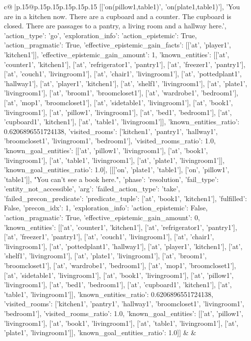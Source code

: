 \documentclass{article}
\begin{document}
{\begin{supertabular}{c@{$\;$}|p{.15\linewidth}@{}p{.15\linewidth}p{.15\linewidth}p{.15\linewidth}p{.15\linewidth}p{.15\linewidth}}
{{{[['on(pillow1,table1)', 'on(plate1,table1)'], 'You are in a kitchen now. There are a cupboard and a counter. The cupboard is closed. There are passages to a pantry, a living room and a hallway here.', {'action_type': 'go', 'exploration_info': {'action_epistemic': True, 'action_pragmatic': True, 'effective_epistemic_gain_facts': [['at', 'player1', 'kitchen1']], 'effective_epistemic_gain_amount': 1, 'known_entities': [['at', 'counter1', 'kitchen1'], ['at', 'refrigerator1', 'pantry1'], ['at', 'freezer1', 'pantry1'], ['at', 'couch1', 'livingroom1'], ['at', 'chair1', 'livingroom1'], ['at', 'pottedplant1', 'hallway1'], ['at', 'player1', 'kitchen1'], ['at', 'shelf1', 'livingroom1'], ['at', 'plate1', 'livingroom1'], ['at', 'broom1', 'broomcloset1'], ['at', 'wardrobe1', 'bedroom1'], ['at', 'mop1', 'broomcloset1'], ['at', 'sidetable1', 'livingroom1'], ['at', 'book1', 'livingroom1'], ['at', 'pillow1', 'livingroom1'], ['at', 'bed1', 'bedroom1'], ['at', 'cupboard1', 'kitchen1'], ['at', 'table1', 'livingroom1']], 'known_entities_ratio': 0.6206896551724138, 'visited_rooms': ['kitchen1', 'pantry1', 'hallway1', 'broomcloset1', 'livingroom1', 'bedroom1'], 'visited_rooms_ratio': 1.0, 'known_goal_entities': [['at', 'pillow1', 'livingroom1'], ['at', 'book1', 'livingroom1'], ['at', 'table1', 'livingroom1'], ['at', 'plate1', 'livingroom1']], 'known_goal_entities_ratio': 1.0}}], [[['on', 'plate1', 'table1'], ['on', 'pillow1', 'table1']], "You can't see a book here.", {'phase': 'resolution', 'fail_type': 'entity_not_accessible', 'arg': {'failed_action_type': 'take', 'failed_precon_predicate': {'predicate_tuple': ['at', 'book1', 'kitchen1'], 'fulfilled': False, 'precon_idx': 1}}, 'exploration_info': {'action_epistemic': False, 'action_pragmatic': True, 'effective_epistemic_gain_amount': 0, 'known_entities': [['at', 'counter1', 'kitchen1'], ['at', 'refrigerator1', 'pantry1'], ['at', 'freezer1', 'pantry1'], ['at', 'couch1', 'livingroom1'], ['at', 'chair1', 'livingroom1'], ['at', 'pottedplant1', 'hallway1'], ['at', 'player1', 'kitchen1'], ['at', 'shelf1', 'livingroom1'], ['at', 'plate1', 'livingroom1'], ['at', 'broom1', 'broomcloset1'], ['at', 'wardrobe1', 'bedroom1'], ['at', 'mop1', 'broomcloset1'], ['at', 'sidetable1', 'livingroom1'], ['at', 'book1', 'livingroom1'], ['at', 'pillow1', 'livingroom1'], ['at', 'bed1', 'bedroom1'], ['at', 'cupboard1', 'kitchen1'], ['at', 'table1', 'livingroom1']], 'known_entities_ratio': 0.6206896551724138, 'visited_rooms': ['kitchen1', 'pantry1', 'hallway1', 'broomcloset1', 'livingroom1', 'bedroom1'], 'visited_rooms_ratio': 1.0, 'known_goal_entities': [['at', 'pillow1', 'livingroom1'], ['at', 'book1', 'livingroom1'], ['at', 'table1', 'livingroom1'], ['at', 'plate1', 'livingroom1']], 'known_goal_entities_ratio': 1.0}}]] 
	  } 
	   } 
	   } 
	 & & \\ 
 


\end{supertabular}}
\end{document}
